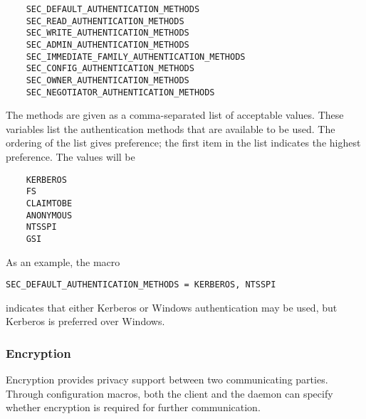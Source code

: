 \begin{verbatim}
    SEC_DEFAULT_AUTHENTICATION_METHODS
    SEC_READ_AUTHENTICATION_METHODS
    SEC_WRITE_AUTHENTICATION_METHODS
    SEC_ADMIN_AUTHENTICATION_METHODS
    SEC_IMMEDIATE_FAMILY_AUTHENTICATION_METHODS
    SEC_CONFIG_AUTHENTICATION_METHODS
    SEC_OWNER_AUTHENTICATION_METHODS
    SEC_NEGOTIATOR_AUTHENTICATION_METHODS
\end{verbatim}
The methods are
given as a comma-separated list of acceptable values.
These variables list the authentication methods that are available
to be used.
The ordering of the list gives preference;
the first item in the list indicates the highest preference.
The values will be 
\begin{verbatim}
    KERBEROS
    FS
    CLAIMTOBE
    ANONYMOUS
    NTSSPI
    GSI
\end{verbatim}

As an example, the macro
\begin{verbatim}
SEC_DEFAULT_AUTHENTICATION_METHODS = KERBEROS, NTSSPI
\end{verbatim}
indicates that either Kerberos or Windows authentication may be used,
but Kerberos is preferred over Windows.


\subsubsection{\label{sec:Security-Encryption} Encryption}
Encryption provides privacy support between two communicating parties.
Through configuration macros, both the client and the daemon
can specify whether encryption is required for further communication.

